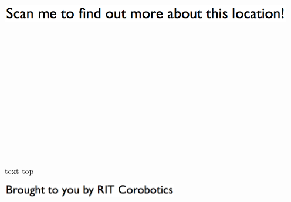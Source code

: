 \documentclass[letterpaper]{article}
\begin{document}
 \begingroup 
 \centerline{\includegraphics[scale=1,width=5in,height=5in]{text-top.png}} 
 \endgroup 
 \vspace*{\fill} 

 \hfill{\small text-top} 

  \vspace{0.7in} 
 
 \centerline{\includegraphics[scale=1,width=3in]{text-bottom.png}} 
 
 \pagebreak 
\end{document}
